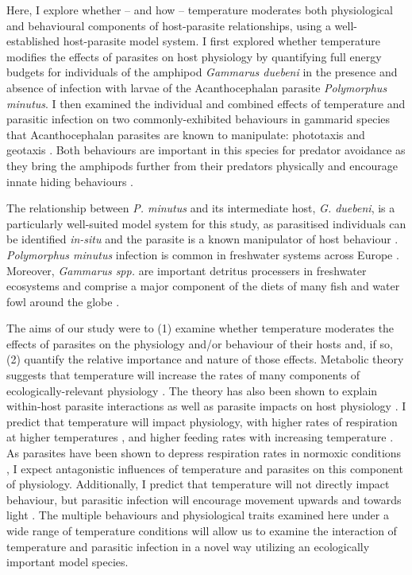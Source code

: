 Here, I explore whether – and how – temperature moderates both physiological and behavioural components of host-parasite relationships, using a well-established host-parasite model system. I first explored whether temperature modifies the effects of parasites on host physiology by quantifying full energy budgets for individuals of the amphipod \emph{Gammarus duebeni} in the presence and absence of infection with larvae of the Acanthocephalan parasite \emph{Polymorphus minutus}. I then examined the individual and combined effects of temperature and parasitic infection on two commonly-exhibited behaviours in gammarid species that Acanthocephalan parasites are known to manipulate: phototaxis and geotaxis \citep{bauer2005, perrot2012}. Both behaviours are important in this species for predator avoidance as they bring the amphipods further from their predators physically and encourage innate hiding behaviours \citep{bethel1973, cezilly2000, bauer2005, jacquin2014, perrot2016}. 

The relationship between \emph{P. minutus} and its intermediate host, \emph{G. duebeni}, is a particularly well-suited model system for this study, as parasitised individuals can be identified \emph{in-situ} and the parasite is a known manipulator of host behaviour \citep{moore1996, fielding2003, benesh2005, perrot2007, jacquin2014}. \emph{Polymorphus minutus} infection is common in freshwater systems across Europe \citep{medoc2006}. Moreover, \emph{Gammarus spp.} are important detritus processers in freshwater ecosystems \citep{macneil1997, sutcliffe2000} and comprise a major component of the diets of many fish and water fowl around the globe \citep{mortensen1982, byers2010}.

The aims of our study were to (1) examine whether temperature moderates the effects of parasites on the physiology and/or behaviour of their hosts and, if so, (2) quantify the relative importance and nature of those effects. Metabolic theory suggests that temperature will increase the rates of many components of ecologically-relevant physiology \citep{brown2004, kordas2011}. The theory has also been shown to explain within-host parasite interactions as well as parasite impacts on host physiology \citep{kirk2018}. I predict that temperature will impact physiology, with higher rates of respiration at higher temperatures \citep{halcrow1967, bulnheim1979}, and higher feeding rates with increasing temperature \citep{nilsson1974}. As parasites have been shown to depress respiration rates in normoxic conditions \citep{perrot2016}, I expect antagonistic influences of temperature and parasites on this component of physiology. Additionally, I predict that temperature will not directly impact behaviour, but parasitic infection will encourage movement upwards and towards light \citep{labaude2017}. The multiple behaviours and physiological traits examined here under a wide range of temperature conditions will allow us to examine the interaction of temperature and parasitic infection in a novel way utilizing an ecologically important model species. 

